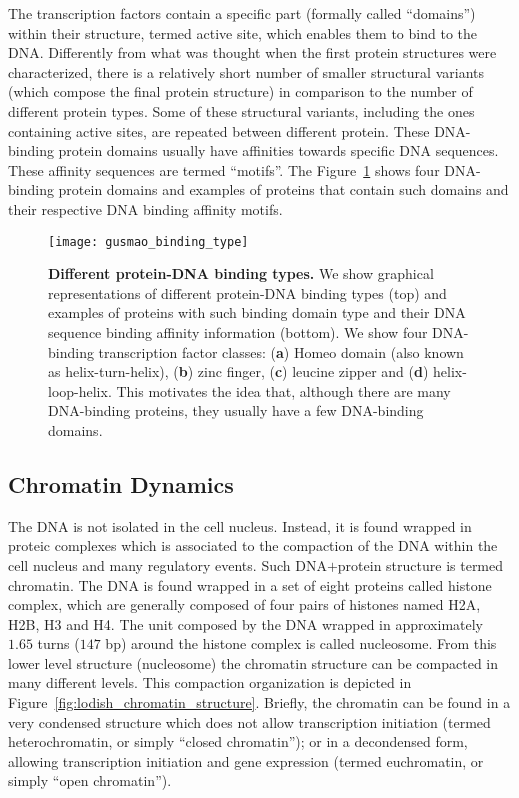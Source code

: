 The transcription factors contain a specific part (formally called ``domains'') within their structure, termed active site, which enables them to bind to the DNA. Differently from what was thought when the first protein structures were characterized, there is a relatively short number of smaller structural variants (which compose the final protein structure) in comparison to the number of different protein types. Some of these structural variants, including the ones containing active sites, are repeated between different protein. These DNA-binding protein domains usually have affinities towards specific DNA sequences. These affinity sequences are termed ``motifs''. The Figure~\ref{fig:gusmao_binding_type} shows four DNA-binding protein domains and examples of proteins that contain such domains and their respective DNA binding affinity motifs.

\begin{figure}[h!]
\centering
\texttt{[image: gusmao\_binding\_type]}
\caption[Different protein-DNA binding types]{\textbf{Different protein-DNA binding types.} We show graphical representations of different protein-DNA binding types (top) and examples of proteins with such binding domain type and their DNA sequence binding affinity information (bottom). We show four DNA-binding transcription factor classes: (\textbf{a}) Homeo domain (also known as helix-turn-helix), (\textbf{b}) zinc finger, (\textbf{c}) leucine zipper and (\textbf{d}) helix-loop-helix. This motivates the idea that, although there are many DNA-binding proteins, they usually have a few DNA-binding domains.}
\label{fig:gusmao_binding_type}
\end{figure}

\subsection{Chromatin Dynamics}
\label{sec:chromatin.dynamics}

The DNA is not isolated in the cell nucleus. Instead, it is found wrapped in proteic complexes which is associated to the compaction of the DNA within the cell nucleus and many regulatory events. Such DNA$+$protein structure is termed chromatin. The DNA is found wrapped in a set of eight proteins called histone complex, which are generally composed of four pairs of histones named H2A, H2B, H3 and H4. The unit composed by the DNA wrapped in approximately $1.65$ turns (\approxy$147$ bp) around the histone complex is called nucleosome. From this lower level structure (nucleosome) the chromatin structure can be compacted in many different levels. This compaction organization is depicted in Figure~\ref{fig:lodish_chromatin_structure}. Briefly, the chromatin can be found in a very condensed structure which does not allow transcription initiation (termed heterochromatin, or simply ``closed chromatin''); or in a decondensed form, allowing transcription initiation and gene expression (termed euchromatin, or simply ``open chromatin'').

